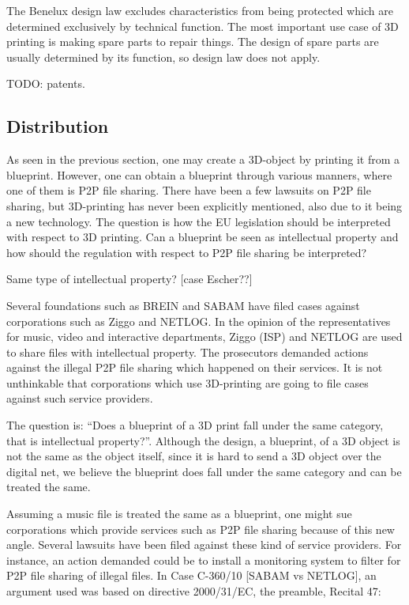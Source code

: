 The Benelux design law excludes characteristics from being protected which are determined exclusively by technical function.
The most important use case of 3D printing is making spare parts to repair things.
The design of spare parts are usually determined by its function, so design law does not apply.

TODO: patents.


\subsection{Distribution}

As seen in the previous section, one may create a 3D-object by printing it from a blueprint. However, one can obtain a blueprint through various manners, where one of them is P2P file sharing. There have been a few lawsuits on P2P file sharing, but 3D-printing has never been explicitly mentioned, also due to it being a new technology. The question is how the EU legislation should be interpreted with respect to 3D printing. Can a blueprint be seen as intellectual property and how should the regulation with respect to P2P file sharing be interpreted?

Same type of intellectual property?
[case Escher??]

Several foundations such as BREIN and SABAM have filed cases against corporations such as Ziggo and NETLOG. In the opinion of the representatives for music, video and interactive departments, Ziggo (ISP) and NETLOG are used to share files with intellectual property. The prosecutors demanded actions against the illegal P2P file sharing which happened on their services. It is not unthinkable that corporations which use 3D-printing are going to file cases against such service providers.

The question is: “Does a blueprint of a 3D print fall under the same category, that is intellectual property?”. Although the design, a blueprint, of a 3D object is not the same as the object itself, since it is hard to send a 3D object over the digital net, we believe the blueprint does fall under the same category and can be treated the same.

Assuming a music file is treated the same as a blueprint, one might sue corporations which provide services such as P2P file sharing because of this new angle. Several lawsuits have been filed against these kind of service providers. For instance, an action demanded could be to install a monitoring system to filter for P2P file sharing of illegal files. In Case C-360/10 [SABAM vs NETLOG], an argument used was based on directive 2000/31/EC, the preamble, Recital 47: 

